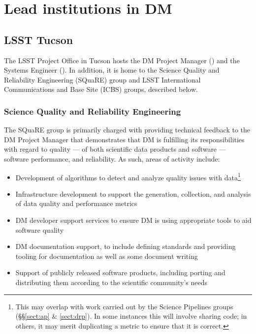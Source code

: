 \section{Lead institutions in DM \label{sect:leadtutes}}

\subsection{LSST Tucson\label{sect:tucson}}

The LSST Project Office in Tucson hosts the DM Project Manager () and the Systems Engineer ().
In addition, it is home to the Science Quality and Reliability Engineering (SQuaRE) group and LSST International Communications and Base Site (ICBS) groups, described below.

\subsubsection{Science Quality and Reliability Engineering \label{sect:square}}

The SQuaRE group is primarily charged with providing technical feedback to the DM Project Manager that demonstrates that DM is fulfilling its responsibilities with regard to quality — of both scientific data products and software — software performance, and reliability. As such, areas of activity include:

\begin{itemize}

\item Development of algorithms to detect and analyze quality issues with data\footnote{This may overlap with work carried out by the Science Pipelines groups (\S\S\ref{sect:ap} \& \ref{sect:drp}). In some instances this will involve sharing code; in others, it may merit duplicating a metric to ensure that it is correct.}

\item Infrastructure development to support the generation, collection, and analysis of data quality and performance metrics

\item DM developer support services to ensure DM is using appropriate tools to aid software quality

\item DM documentation support, to include defining standards and providing tooling for documentation as well as some document writing

\item Support of publicly released software products, including porting and distributing them according to the scientific community's needs

\end{itemize}

